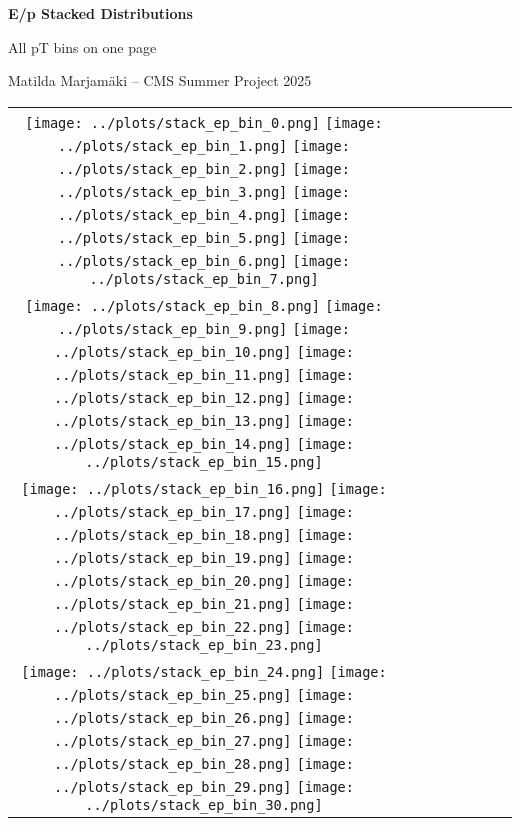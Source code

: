 \documentclass[a4paper,10pt]{article}
\begin{document}
\begin{center}
    \Huge \textbf{E/p Stacked Distributions}\par\vspace{1ex}
    \Large All pT bins on one page\par\vspace{1ex}
    \normalsize Matilda Marjamäki -- CMS Summer Project 2025
\end{center}
\vspace{0.6cm}
\begin{center}
\setlength{\tabcolsep}{2pt}
\renewcommand{\arraystretch}{1.0}
\begin{tabular}{cccccccc}
    \texttt{[image: ../plots/stack\_ep\_bin\_0.png]} %
    \texttt{[image: ../plots/stack\_ep\_bin\_1.png]} %
    \texttt{[image: ../plots/stack\_ep\_bin\_2.png]} %
    \texttt{[image: ../plots/stack\_ep\_bin\_3.png]} %
    \texttt{[image: ../plots/stack\_ep\_bin\_4.png]} %
    \texttt{[image: ../plots/stack\_ep\_bin\_5.png]} %
    \texttt{[image: ../plots/stack\_ep\_bin\_6.png]} %
    \texttt{[image: ../plots/stack\_ep\_bin\_7.png]} \\
    \texttt{[image: ../plots/stack\_ep\_bin\_8.png]} %
    \texttt{[image: ../plots/stack\_ep\_bin\_9.png]} %
    \texttt{[image: ../plots/stack\_ep\_bin\_10.png]} %
    \texttt{[image: ../plots/stack\_ep\_bin\_11.png]} %
    \texttt{[image: ../plots/stack\_ep\_bin\_12.png]} %
    \texttt{[image: ../plots/stack\_ep\_bin\_13.png]} %
    \texttt{[image: ../plots/stack\_ep\_bin\_14.png]} %
    \texttt{[image: ../plots/stack\_ep\_bin\_15.png]} \\
    \texttt{[image: ../plots/stack\_ep\_bin\_16.png]} %
    \texttt{[image: ../plots/stack\_ep\_bin\_17.png]} %
    \texttt{[image: ../plots/stack\_ep\_bin\_18.png]} %
    \texttt{[image: ../plots/stack\_ep\_bin\_19.png]} %
    \texttt{[image: ../plots/stack\_ep\_bin\_20.png]} %
    \texttt{[image: ../plots/stack\_ep\_bin\_21.png]} %
    \texttt{[image: ../plots/stack\_ep\_bin\_22.png]} %
    \texttt{[image: ../plots/stack\_ep\_bin\_23.png]} \\
    \texttt{[image: ../plots/stack\_ep\_bin\_24.png]} %
    \texttt{[image: ../plots/stack\_ep\_bin\_25.png]} %
    \texttt{[image: ../plots/stack\_ep\_bin\_26.png]} %
    \texttt{[image: ../plots/stack\_ep\_bin\_27.png]} %
    \texttt{[image: ../plots/stack\_ep\_bin\_28.png]} %
    \texttt{[image: ../plots/stack\_ep\_bin\_29.png]} %
    \texttt{[image: ../plots/stack\_ep\_bin\_30.png]} %
\end{tabular}
\end{center}
\newpage
\end{document}
